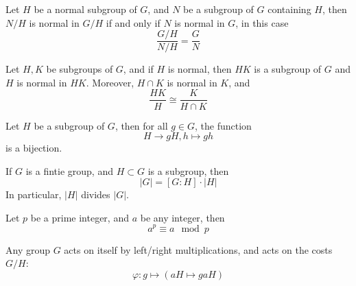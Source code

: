 \documentclass[openany]{book}
\begin{document}
\begin{prop}
    Let $H$ be a normal subgroup of $G$, and $N$ be a subgroup of $G$ containing $H$, then $N/H$ is normal in $G/H$ if and only if $N$ is normal in $G$, in this case
    \begin{equation*}
        \frac{G/H}{N/H}=\frac{G}{N}
    \end{equation*}
\end{prop}



\begin{prop}
    Let $H,K$ be subgroups of $G$, and if $H$ is normal, then $HK$ is a subgroup of $G$ and $H$ is normal in $HK$. Moreover, $H\cap K$ is normal in $K$, and 
    \begin{equation*}
        \frac{HK}{H}\cong\frac{K}{H\cap K}
    \end{equation*}
\end{prop}


\begin{prop}
    Let $H$ be a subgroup of $G$, then for all $g\in G$, the function 
    \begin{equation*}
        H\to gH, h\mapsto gh
    \end{equation*}
    is a bijection.
\end{prop}

\begin{thm}[Lagrange]
    If $G$ is a fintie group, and $H\subset G$ is a subgroup, then 
    \begin{equation*}
        |G|=[G:H]\cdot|H|
    \end{equation*}
    In particular, $|H|$ divides $|G|$.
\end{thm}

\begin{thm}
    Let $p$ be a prime integer, and $a$ be any integer, then 
    \begin{equation*}
        a^p\equiv a\mod p
    \end{equation*}
\end{thm}


\begin{prop}
    Any group $G$ acts on itself by left/right multiplications, and acts on the costs $G/H$:
    \begin{equation*}
        \varphi: g\mapsto \left(aH\mapsto gaH\right)
    \end{equation*}
\end{prop}
\end{document}

